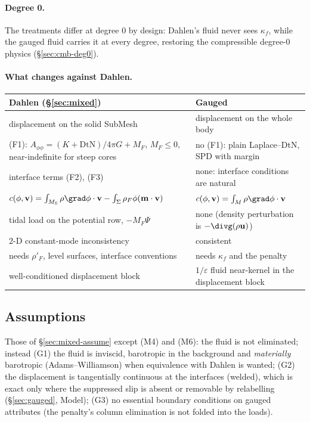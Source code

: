 \documentclass[11pt]{article}
\numberwithin{equation}{section}
\theoremstyle{remark}
\newcommand{\eps}{\varepsilon}
\newcommand{\DtN}{\mathrm{DtN}}
\newcommand{\vu}{\mathbf{u}}
\newcommand{\vv}{\mathbf{v}}
\newcommand{\vm}{\mathbf{m}}
\newcommand{\MS}{M_{\mathrm{S}}}
\begin{document}
\paragraph{Degree 0.} The treatments differ at degree 0 by design: Dahlen's
fluid never sees $\kappa_f$, while the gauged fluid carries it at every
degree, restoring the compressible degree-0 physics
(\S\ref{sec:cmb-deg0}).

\paragraph{What changes against Dahlen.}
\begin{center}
\small
\begin{tabular}{@{}P{7.0cm}P{7.0cm}@{}}
\toprule
Dahlen (\S\ref{sec:mixed}) & Gauged \\
\midrule
displacement on the solid SubMesh & displacement on the whole body \\
(F1): $A_{\phi\phi} = (K+\DtN)/4\pi G + M_F$, $M_F\le0$, near-indefinite for steep cores & no (F1): plain Laplace--DtN, SPD with margin \\
interface terms (F2), (F3) & none: interface conditions are natural \\
$c(\phi,\vv) = \int_{\MS}\rho\grad\phi\cdot\vv - \int_\Sigma\rho_F\phi(\vm\cdot\vv)$ & $c(\phi,\vv) = \int_M\rho\grad\phi\cdot\vv$ \\
tidal load on the potential row, $-M_F\Psi$ & none (density perturbation is $-\divg(\rho\vu)$) \\
2-D constant-mode inconsistency & consistent \\
needs $\rho'_F$, level surfaces, interface conventions & needs $\kappa_f$ and the penalty \\
well-conditioned displacement block & $1/\eps$ fluid near-kernel in the displacement block \\
\bottomrule
\end{tabular}
\end{center}

\subsection{Assumptions}

Those of \S\ref{sec:mixed-assume} except (M4) and (M6): the fluid is not
eliminated; instead (G1) the fluid is inviscid, barotropic in the
background and \emph{materially} barotropic (Adams--Williamson) when
equivalence with Dahlen is wanted; (G2) the displacement is tangentially continuous at the
interfaces (welded), which is exact only where the suppressed slip is
absent or removable by relabelling (\S\ref{sec:gauged}, Model);
(G3) no essential boundary conditions on gauged attributes (the penalty's
column elimination is not folded into the loads).
\end{document}
